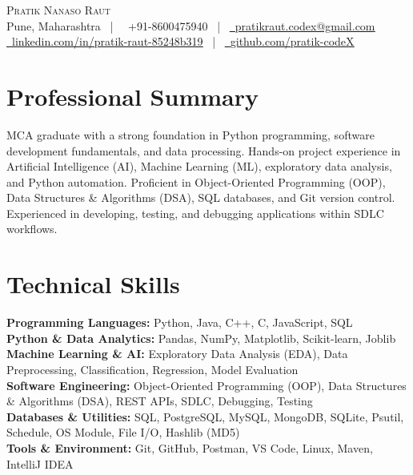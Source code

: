 \documentclass[letterpaper,11pt]{article}
\newcommand{\faPhone}{}
\newcommand{\faEnvelope}{}
\newcommand{\faLinkedin}{}
\newcommand{\faGithub}{}
\begin{document}
\begin{center}
    {\Huge \scshape Pratik Nanaso Raut} \\ \vspace{2pt}
    \small Pune, Maharashtra ~|~ 
    \faPhone\ +91-8600475940 ~|~ 
    \href{mailto:pratikraut.codex@gmail.com}{\faEnvelope\ \underline{pratikraut.codex@gmail.com}} \\ \vspace{2pt}
    \href{https://linkedin.com/in/pratik-raut-85248b319}{\faLinkedin\ \underline{linkedin.com/in/pratik-raut-85248b319}} ~|~ 
    \href{https://github.com/pratik-codeX}{\faGithub\ \underline{github.com/pratik-codeX}}
\end{center}

\section{Professional Summary}
MCA graduate with a strong foundation in Python programming, software development fundamentals, and data processing. Hands-on project experience in Artificial Intelligence (AI), Machine Learning (ML), exploratory data analysis, and Python automation. Proficient in Object-Oriented Programming (OOP), Data Structures \& Algorithms (DSA), SQL databases, and Git version control. Experienced in developing, testing, and debugging applications within SDLC workflows.

\section{Technical Skills}
\vspace{1pt}
\textbf{Programming Languages:} Python, Java, C++, C, JavaScript, SQL \\[1.5pt]
\textbf{Python \& Data Analytics:} Pandas, NumPy, Matplotlib, Scikit-learn, Joblib \\[1.5pt]
\textbf{Machine Learning \& AI:} Exploratory Data Analysis (EDA), Data Preprocessing, Classification, Regression, Model Evaluation \\[1.5pt]
\textbf{Software Engineering:} Object-Oriented Programming (OOP), Data Structures \& Algorithms (DSA), REST APIs, SDLC, Debugging, Testing \\[1.5pt]
\textbf{Databases \& Utilities:} SQL, PostgreSQL, MySQL, MongoDB, SQLite, Psutil, Schedule, OS Module, File I/O, Hashlib (MD5) \\[1.5pt]
\textbf{Tools \& Environment:} Git, GitHub, Postman, VS Code, Linux, Maven, IntelliJ IDEA
\end{document}

